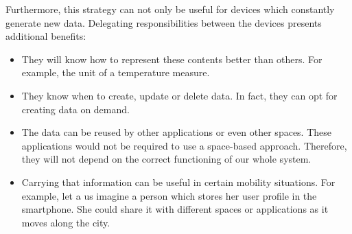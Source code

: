 Furthermore, this strategy can not only be useful for devices which constantly generate new data.
Delegating responsibilities between the devices presents additional benefits:
\begin{itemize}
  \item They will know how to represent these contents better than others. %
	For example, the unit of a temperature measure.
  \item They know when to create, update or delete data. %
        In fact, they can opt for creating data on demand.
  \item The data can be reused by other applications or even other spaces. %
        These applications would not be required to use a space-based approach.
        Therefore, they will not depend on the correct functioning of our whole system. %
  \item Carrying that information can be useful in certain mobility situations.
        For example, let a us imagine a person which stores her user profile in the smartphone.
        She could share it with different spaces or applications as it moves along the city.
\end{itemize}


